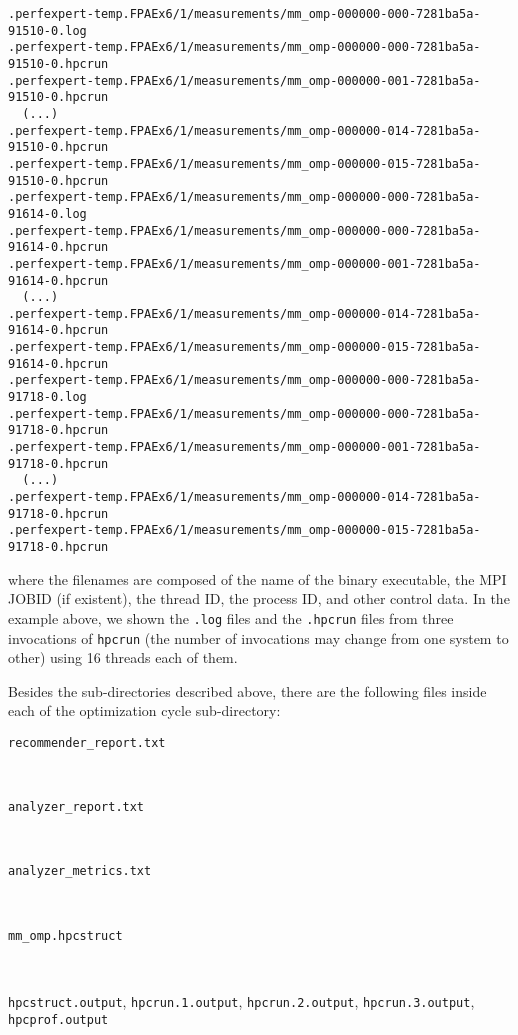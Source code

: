 \begin{lstlisting}[breaklines]
.perfexpert-temp.FPAEx6/1/measurements/mm_omp-000000-000-7281ba5a-91510-0.log
.perfexpert-temp.FPAEx6/1/measurements/mm_omp-000000-000-7281ba5a-91510-0.hpcrun
.perfexpert-temp.FPAEx6/1/measurements/mm_omp-000000-001-7281ba5a-91510-0.hpcrun
  (...)
.perfexpert-temp.FPAEx6/1/measurements/mm_omp-000000-014-7281ba5a-91510-0.hpcrun
.perfexpert-temp.FPAEx6/1/measurements/mm_omp-000000-015-7281ba5a-91510-0.hpcrun
.perfexpert-temp.FPAEx6/1/measurements/mm_omp-000000-000-7281ba5a-91614-0.log
.perfexpert-temp.FPAEx6/1/measurements/mm_omp-000000-000-7281ba5a-91614-0.hpcrun
.perfexpert-temp.FPAEx6/1/measurements/mm_omp-000000-001-7281ba5a-91614-0.hpcrun
  (...)
.perfexpert-temp.FPAEx6/1/measurements/mm_omp-000000-014-7281ba5a-91614-0.hpcrun
.perfexpert-temp.FPAEx6/1/measurements/mm_omp-000000-015-7281ba5a-91614-0.hpcrun
.perfexpert-temp.FPAEx6/1/measurements/mm_omp-000000-000-7281ba5a-91718-0.log
.perfexpert-temp.FPAEx6/1/measurements/mm_omp-000000-000-7281ba5a-91718-0.hpcrun
.perfexpert-temp.FPAEx6/1/measurements/mm_omp-000000-001-7281ba5a-91718-0.hpcrun
  (...)
.perfexpert-temp.FPAEx6/1/measurements/mm_omp-000000-014-7281ba5a-91718-0.hpcrun
.perfexpert-temp.FPAEx6/1/measurements/mm_omp-000000-015-7281ba5a-91718-0.hpcrun
\end{lstlisting}

\noindent where the filenames are composed of the name of the binary executable, the MPI JOBID (if existent), the thread ID, the process ID, and other control data. In the example above, we shown the \texttt{.log} files and the \texttt{.hpcrun} files from three invocations of \texttt{hpcrun} (the number of invocations may change from one system to other) using 16 threads each of them.

Besides the sub-directories described above, there are the following files inside each of the optimization cycle sub-directory:

\begin{description}
	\item[\texttt{recommender\_report.txt}]\hfill \\

	\item[\texttt{analyzer\_report.txt}]\hfill \\

	\item[\texttt{analyzer\_metrics.txt}]\hfill \\

	\item[\texttt{mm\_omp.hpcstruct}]\hfill \\

	\item[\texttt{hpcstruct.output}, \texttt{hpcrun.1.output}, \texttt{hpcrun.2.output}, \texttt{hpcrun.3.output}, \texttt{hpcprof.output}]\hfill \\

\end{description}

